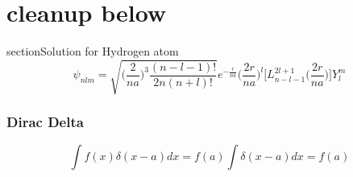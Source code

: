 \section{cleanup below}

section{Solution for Hydrogen atom}
\begin{equation}
  \psi_{nlm}=\sqrt{\bigg(\frac{2}{na}\bigg)^{3}\frac{(n-l-1)!}{2n(n+l)!}}e^{-\frac{r}{na}}\bigg(\frac{2r}{na}\bigg)^{l}\big[L^{2l+1}_{n-l-1}\big(\frac{2r}{na}\big)\big]Y^{m}_{l}
\end{equation}


\subsubsection{Dirac Delta}
\begin{equation}
  \int f(x)\delta(x-a)dx=f(a)\int\delta(x-a)dx=f(a)
\end{equation}










